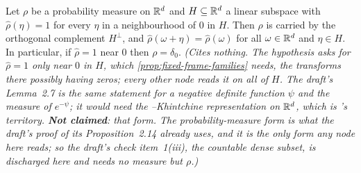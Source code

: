 \begin{lemma}
\label{lem:charfn-one-on-subspace}
\leanok
Let $\rho$ be a probability measure on $\mathbb{R}^d$ and $H \subseteq \mathbb{R}^d$ a linear subspace with
$\widehat\rho(\eta) = 1$ for every $\eta$ in a neighbourhood of $0$ in $H$. Then $\rho$ is carried
by the orthogonal complement $H^\perp$, and $\widehat\rho(\omega + \eta) = \widehat\rho(\omega)$ for all
$\omega \in \mathbb{R}^d$ and $\eta \in H$. In particular, if $\widehat\rho = 1$ near $0$ then
$\rho = \delta_0$.
\statusT\quad\emph{(Cites nothing. The hypothesis asks for $\widehat\rho = 1$ only near $0$ in
$H$, which \ref{prop:fixed-frame-families} needs, the transforms there possibly having zeros; every
other node reads it on all of $H$. The draft's Lemma~2.7 is the same statement for a
negative definite function $\psi$ and the \Levy{} measure of $e^{-\psi}$; it would need the
\Levy--Khintchine representation on $\mathbb{R}^d$, which is 's territory. \textbf{Not
claimed}: that form. The probability-measure form is what the draft's proof of its
Proposition~2.14 already uses, and it is the only form any node here reads; so the draft's check
item~1(iii), the countable dense subset, is discharged here and needs no measure but $\rho$.)}
\end{lemma}

